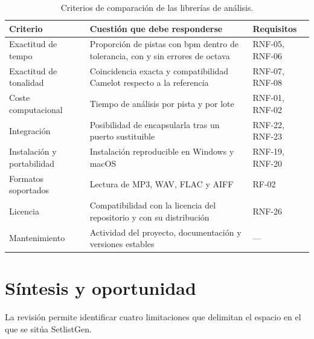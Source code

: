 \begin{table}[htbp]
  \centering
  \caption{Criterios de comparación de las librerías de análisis.}
  \label{tab:eda-criterios}
  \small
  \begin{tabularx}{\textwidth}{|l|X|l|}
    \hline
    \textbf{Criterio} & \textbf{Cuestión que debe responderse} & \textbf{Requisitos} \\
    \hline
    Exactitud de tempo & Proporción de pistas con \acs{bpm} dentro de tolerancia, con y sin errores de octava & RNF-05, RNF-06 \\
    \hline
    Exactitud de tonalidad & Coincidencia exacta y compatibilidad Camelot respecto a la referencia & RNF-07, RNF-08 \\
    \hline
    Coste computacional & Tiempo de análisis por pista y por lote & RNF-01, RNF-02 \\
    \hline
    Integración & Posibilidad de encapsularla tras un puerto sustituible & RNF-22, RNF-23 \\
    \hline
    Instalación y portabilidad & Instalación reproducible en Windows y macOS & RNF-19, RNF-20 \\
    \hline
    Formatos soportados & Lectura de MP3, WAV, FLAC y AIFF & RF-02 \\
    \hline
    Licencia & Compatibilidad con la licencia del repositorio y con su distribución & RNF-26 \\
    \hline
    Mantenimiento & Actividad del proyecto, documentación y versiones estables & --- \\
    \hline
  \end{tabularx}
\end{table}

\section{Síntesis y oportunidad}
\label{sec:eda-sintesis}

La revisión permite identificar cuatro limitaciones que delimitan el espacio en el que se sitúa SetlistGen.

